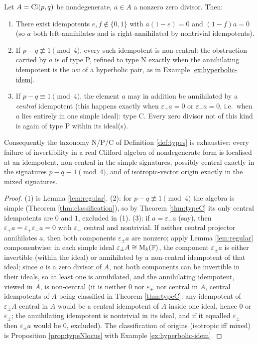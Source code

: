 \begin{theorem}\label{thm:annihilator}
Let $A = \mathrm{Cl}(p,q)$ be nondegenerate, $a \in A$ a nonzero zero divisor. Then:
\begin{enumerate}
\item There exist idempotents $e, f \notin \{0, 1\}$ with $a(1-e) = 0$ and $(1-f)a = 0$ (so $a$ both left-annihilates and is right-annihilated by nontrivial idempotents).
\item If $p - q \not\equiv 1 \pmod 4$, every such idempotent is non-central: the obstruction carried by $a$ is of type P, refined to type N exactly when the annihilating idempotent is the $wv$ of a hyperbolic pair, as in Example \ref{ex:hyperbolic-idem}.
\item If $p - q \equiv 1 \pmod 4$, the element $a$ may in addition be annihilated by a \emph{central} idempotent (this happens exactly when $\varepsilon_+ a = 0$ or $\varepsilon_- a = 0$, i.e.\ when $a$ lies entirely in one simple ideal): type C. Every zero divisor not of this kind is again of type P within its ideal(s).
\end{enumerate}
Consequently the taxonomy N/P/C of Definition \ref{def:types} is exhaustive: every failure of invertibility in a real Clifford algebra of nondegenerate form is localised at an idempotent, non-central in the simple signatures, possibly central exactly in the signatures $p - q \equiv 1 \pmod 4$, and of isotropic-vector origin exactly in the mixed signatures.
\end{theorem}

\begin{proof}
(1) is Lemma \ref{lem:regular}. (2): for $p - q \not\equiv 1 \pmod 4$ the algebra is simple (Theorem \ref{thm:classification}), so by Theorem \ref{thm:typeC} its only central idempotents are $0$ and $1$, excluded in (1). (3): if $a = \varepsilon_- a$ (say), then $\varepsilon_+ a = \varepsilon_+ \varepsilon_- a = 0$ with $\varepsilon_+$ central and nontrivial. If neither central projector annihilates $a$, then both components $\varepsilon_\pm a$ are nonzero; apply Lemma \ref{lem:regular} componentwise: in each simple ideal $\varepsilon_\pm A \cong \mathrm{M}_k(\mathbb{F})$, the component $\varepsilon_\pm a$ is either invertible (within the ideal) or annihilated by a non-central idempotent of that ideal; since $a$ is a zero divisor of $A$, not both components can be invertible in their ideals, so at least one is annihilated, and the annihilating idempotent, viewed in $A$, is non-central (it is neither $0$ nor $\varepsilon_\pm$ nor central in $A$, central idempotents of $A$ being classified in Theorem \ref{thm:typeC}: any idempotent of $\varepsilon_\pm A$ central in $A$ would be a central idempotent of $A$ inside one ideal, hence $0$ or $\varepsilon_\pm$; the annihilating idempotent is nontrivial in its ideal, and if it equalled $\varepsilon_\pm$ then $\varepsilon_\pm a$ would be $0$, excluded). The classification of origins (isotropic iff mixed) is Proposition \ref{prop:typeNlocus} with Example \ref{ex:hyperbolic-idem}.
\end{proof}

